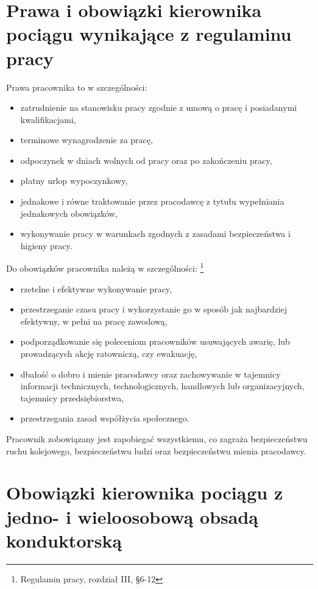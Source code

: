 
\chapter{Prawa i obowiązki kierownika pociągu wynikające z regulaminu pracy}
Prawa pracownika to w szczególności:
\begin{itemize}
	\item zatrudnienie na stanowisku pracy zgodnie z umową o pracę i posiadanymi kwalifikacjami,
	\item terminowe wynagrodzenie za pracę, 
	\item odpoczynek w dniach wolnych od pracy oraz po zakończeniu pracy, 
	\item płatny urlop wypoczynkowy, 
	\item jednakowe i równe traktowanie przez pracodawcę z tytułu wypełniania jednakowych obowiązków, 
	\item wykonywanie pracy w warunkach zgodnych z zasadami bezpieczeństwa i higieny pracy.
\end{itemize}
Do obowiązków pracownika należą w szczególności:
\footnote{Regulamin pracy, rozdział III, \S 6-12}

\begin{itemize}
	\item rzetelne i efektywne wykonywanie pracy,
	\item przestrzeganie czasu pracy i wykorzystanie go w sposób jak najbardziej efektywny, w pełni na pracę zawodową,
	\item podporządkowanie się poleceniom pracowników usuwających awarię, lub prowadzących akcję ratowniczą, czy ewakuację,
	\item dbałość o dobro i mienie pracodawcy oraz zachowywanie w tajemnicy informacji technicznych, technologicznych, handlowych lub organizacyjnych, tajemnicy przedsiębiorstwa,
	\item przestrzegania zasad współżycia społecznego.
\end{itemize}
     Pracownik zobowiązany jest zapobiegać wszystkiemu, co zagraża bezpieczeństwu ruchu kolejowego, bezpieczeństwu ludzi oraz bezpieczeństwu mienia pracodawcy. 

\chapter{Obowiązki kierownika pociągu z jedno- i wieloosobową obsadą konduktorską}

